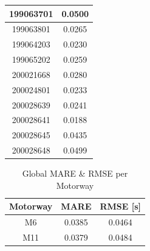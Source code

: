 \documentclass[a4paper, 10pt, conference]{ieeeconf}      %
\begin{document}
\begin{table}[htbp]
\begin{center}
\begin{tabular}{|c|c|}
			\hline
			199063701& 0.0500\\
			\hline
			199063801& 0.0265\\
			\hline
			199064203& 0.0230\\
			\hline
			199065202& 0.0259\\
			\hline
			200021668& 0.0280\\
			\hline
			200024801& 0.0233\\
			\hline
			200028639& 0.0241\\
			\hline
			200028641& 0.0188\\
			\hline
			200028645& 0.0435\\
			\hline
			200028648& 0.0499\\
			\hline
		\end{tabular}
		\label{tab1}
	\end{center}
	\label{table:m6mape}
\end{table}
\begin{table}[htbp]
	\caption{Global MARE \& RMSE per Motorway}
	\begin{center}
		\begin{tabular}{|c|c|c|}
			\hline
			\textbf{Motorway}&{\textbf{MARE}}&{\textbf{RMSE [s]}} \\
			\hline
			M6& 0.0385& 0.0464\\
			\hline
			M11& 0.0379& 0.0484\\
			\hline
		\end{tabular}
		\label{mapeglobal}
	\end{center}
\end{table}
\end{document}
